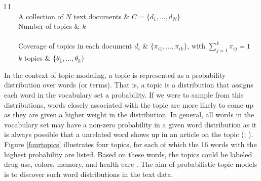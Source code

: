 \documentclass[11pt,a4paper,english,oneside]{book}
\newcommand{\tabitem}{~~\llap{\textbullet}~~}
\numberwithin{equation}{chapter}
\begin{document}
\begin{table}[h] %
	\centering %
	\begin{tabular}{ l  l  } %
		\toprule %
		 \\
		\midrule %
		\tabitem A collection of $N$  text documents & $C=\{d_1,...,d_N\}$ \\
		\tabitem Number of topics & $k$ \\
		\midrule
		 \\
		\midrule
		\tabitem Coverage of topics in each document $d_i$ & $\{\pi_{i1}, ..., \pi_{ik}\}$, with $\sum_{j=1}^{k} \pi_{ij} = 1$\\
		\tabitem $k$ topics & $\{\theta_1, ..., \theta_k\}$\\ %
		\bottomrule %
	\end{tabular}
	\caption{Formal definition of topic modeling task.} %
	\label{tab:task} %
\end{table}

In the context of topic modeling, a topic is represented as a probability distribution over words (or terms). That is, a topic is a distribution that assigns each word in the vocabulary set a probability. If we were to sample from this distributions, words closely associated with the topic are more likely to come up as they are given a higher weight in the distribution. In general, all words in the vocabulary set may have a non-zero probability in a given word distribution as it is always possible that a unrelated word shows up in an article on the topic (\citealt[pp.~335--337]{Zhai.2016}; \citealt[p.~994]{Blei.2003}). Figure \ref{fourtopics} illustrates four topics, for each of which the 16 words with the highest probability are listed. Based on these words, the topics could be labeled drug use, colors, memory, and health care \cite[p.2]{Steyvers(2007)}. The aim of probabilistic topic models is to discover such word distributions in the text data. 
\end{document}
